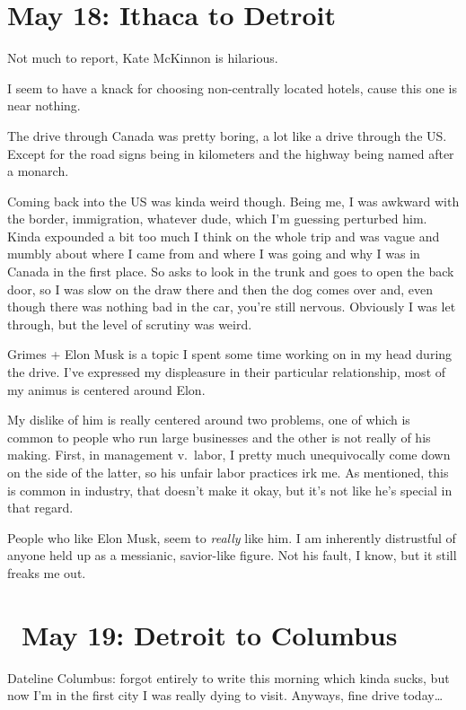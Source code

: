 \documentclass[../butidigress.tex]{subfiles}
\begin{document}
\section{May 18: Ithaca to Detroit}
Not much to report, Kate McKinnon is hilarious.

 I seem to have a knack for choosing non-centrally located hotels, cause this one is near nothing.

The drive through Canada was pretty boring, a lot like a drive through the US\@.
Except for the road signs being in kilometers and the highway being named after a monarch.

Coming back into the US was kinda weird though.
Being me, I was awkward with the border, immigration, whatever dude, which I'm guessing perturbed him.
Kinda expounded a bit too much I think on the whole trip and was vague and mumbly about where I came from and where I was going and why I was in Canada in the first place.
So asks to look in the trunk and goes to open the back door, so I was slow on the draw there and then the dog comes over and, even though there was nothing bad in the car, you're still nervous.
Obviously I was let through, but the level of scrutiny was weird.

Grimes + Elon Musk is a topic I spent some time working on in my head during the drive.
I've expressed my displeasure in their particular relationship, most of my animus is centered around Elon.

My dislike of him is really centered around two problems, one of which is common to people who run large businesses and the other is not really of his making.
First, in management v.\ labor, I pretty much unequivocally come down on the side of the latter, so his unfair labor practices irk me.
As mentioned, this is common in industry, that doesn't make it okay, but it's not like he's special in that regard.

People who like Elon Musk, seem to \emph{really} like him.
I am inherently distrustful of anyone held up as a messianic, savior-like figure.
Not his fault, I know, but it still freaks me out.

\section{\ May 19: Detroit to Columbus}
Dateline Columbus: forgot entirely to write this morning which kinda sucks, but now I'm in the first city I was really dying to visit.
Anyways, fine drive today\ldots
\end{document}
